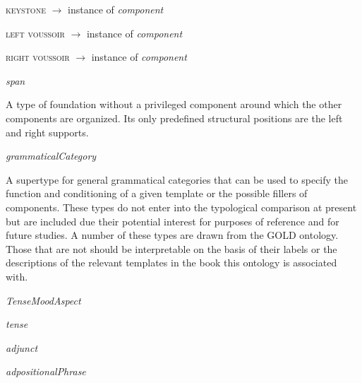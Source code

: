 \begin{ontologytop}
\begin{classlist}
		\begin{proplist}

		\item \textsc{keystone} $\rightarrow$ instance of \emph{component}

		\item \textsc{left voussoir} $\rightarrow$ instance of \emph{component}

		\item \textsc{right voussoir} $\rightarrow$ instance of \emph{component}

		\end{proplist}

	\item \emph{span}
	\hspace{1em}\parbox[t]{\linegoal}{\footnotesize A type of foundation without a privileged component around which the other components are organized. Its only predefined structural positions are the left and right supports.}


	\end{classlist}

\item \emph{grammaticalCategory}
\hspace{1em}\parbox[t]{\linegoal}{\footnotesize A supertype for general grammatical categories that can be used to specify the function and conditioning of a given template or the possible fillers of components. These types do not enter into the typological comparison at present but are included due their potential interest for purposes of reference and for future studies. A number of these types are drawn from the GOLD ontology. Those that are not should be interpretable on the basis of their labels or the descriptions of the relevant templates in the book this ontology is associated with.}


	\begin{classlist}

	\item \emph{TenseMoodAspect}


		\begin{classlist}

		\item \emph{tense}


		\end{classlist}

	\item \emph{adjunct}


	\item \emph{adpositionalPhrase}



\end{classlist}
\end{ontologytop}
